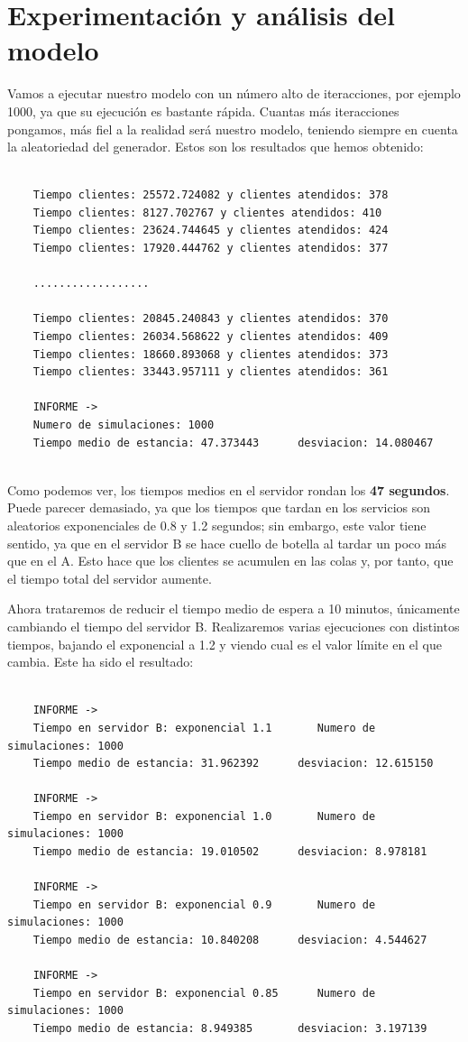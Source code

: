 \documentclass[11pt,a4paper]{article}
\begin{document}
\newpage
\section{Experimentación y análisis del modelo}

Vamos a ejecutar nuestro modelo con un número alto de iteracciones, por ejemplo 1000, ya que su ejecución es bastante rápida. Cuantas más iteracciones
pongamos, más fiel a la realidad será nuestro modelo, teniendo siempre en cuenta la aleatoriedad del generador. Estos son los resultados que hemos
obtenido:

\begin{lstlisting}

	Tiempo clientes: 25572.724082 y clientes atendidos: 378
	Tiempo clientes: 8127.702767 y clientes atendidos: 410
	Tiempo clientes: 23624.744645 y clientes atendidos: 424
	Tiempo clientes: 17920.444762 y clientes atendidos: 377
	
	..................
	
	Tiempo clientes: 20845.240843 y clientes atendidos: 370
	Tiempo clientes: 26034.568622 y clientes atendidos: 409
	Tiempo clientes: 18660.893068 y clientes atendidos: 373
	Tiempo clientes: 33443.957111 y clientes atendidos: 361
	
	INFORME ->
	Numero de simulaciones: 1000
	Tiempo medio de estancia: 47.373443      desviacion: 14.080467
	
\end{lstlisting}
	
Como podemos ver, los tiempos medios en el servidor rondan los \textbf{47 segundos}. Puede parecer demasiado, ya que los tiempos que tardan en los
servicios son aleatorios exponenciales de 0.8 y 1.2 segundos; sin embargo, este valor tiene sentido, ya que en el servidor B se hace cuello de botella
al tardar un poco más que en el A. Esto hace que los clientes se acumulen en las colas y, por tanto, que el tiempo total del servidor aumente.

Ahora trataremos de reducir el tiempo medio de espera a 10 minutos, únicamente cambiando el tiempo del servidor B. Realizaremos varias ejecuciones con
distintos tiempos, bajando el exponencial a 1.2 y viendo cual es el valor límite en el que cambia. Este ha sido el resultado:

\begin{lstlisting}
	
	INFORME ->
	Tiempo en servidor B: exponencial 1.1		Numero de simulaciones: 1000
	Tiempo medio de estancia: 31.962392      desviacion: 12.615150

	INFORME ->
	Tiempo en servidor B: exponencial 1.0		Numero de simulaciones: 1000
	Tiempo medio de estancia: 19.010502      desviacion: 8.978181

	INFORME ->
	Tiempo en servidor B: exponencial 0.9		Numero de simulaciones: 1000
	Tiempo medio de estancia: 10.840208      desviacion: 4.544627

	INFORME ->
	Tiempo en servidor B: exponencial 0.85		Numero de simulaciones: 1000
	Tiempo medio de estancia: 8.949385       desviacion: 3.197139

\end{lstlisting}
\end{document}
